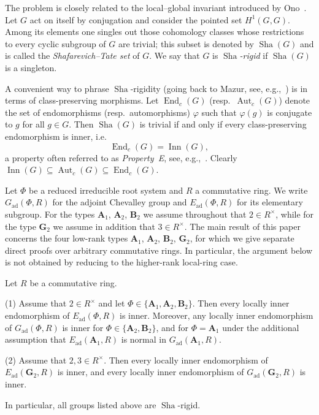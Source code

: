 \documentclass[]{jgcc}
\DeclareMathOperator{\Aut}{Aut}
\DeclareMathOperator{\End}{End}
\DeclareMathOperator{\Inn}{Inn}
\numberwithin{equation}{section}
\newcommand{\Sha}{\operatorname{Sha}}
\begin{document}
The problem is closely related to the local--global invariant introduced by Ono~\cite{BK112,BK115}.
Let $G$ act on itself by conjugation and consider the pointed set $H^{1}(G,G)$.
Among its elements one singles out those cohomology classes whose restrictions to every cyclic subgroup
of $G$ are trivial; this subset is denoted by $\Sha(G)$ and is called the \emph{Shafarevich--Tate set} of $G$.
We say that $G$ is \emph{$\Sha$-rigid} if $\Sha(G)$ is a singleton.

A convenient way to phrase $\Sha$-rigidity (going back to Mazur, see, e.g.,~\cite{BK115,Sah,BK})
is in terms of class-preserving morphisms.
Let $\End_{c}(G)$ (resp.\ $\Aut_{c}(G)$) denote the set of endomorphisms (resp.\ automorphisms)
$\varphi$ such that $\varphi(g)$ is conjugate to $g$ for all $g\in G$.
Then $\Sha(G)$ is trivial if and only if every class-preserving endomorphism is inner, i.e.
\[
\End_{c}(G)=\Inn(G),
\]
a property often referred to as \emph{Property~E}, see, e.g.,~\cite{BK}.
Clearly $\Inn(G)\subseteq \Aut_{c}(G)\subseteq \End_{c}(G)$.

Let $\Phi$ be a reduced irreducible root system and $R$ a commutative ring.
We write $G_{\mathrm{ad}}(\Phi,R)$ for the adjoint Chevalley group and
$E_{\mathrm{ad}}(\Phi,R)$ for its elementary subgroup.
For the types $\mathbf A_1$, $\mathbf A_2$, $\mathbf B_2$ we assume throughout that $2\in R^\times$,
while for the type $\mathbf G_2$ we assume in addition that $3\in R^\times$.
The main result of this paper concerns the four low-rank types
$\mathbf A_1$, $\mathbf A_2$, $\mathbf B_2$, $\mathbf G_2$,
for which we give separate direct proofs over arbitrary commutative rings.
In particular, the argument below is not obtained by reducing to the higher-rank local-ring case.

\begin{thm}\label{thm:main}
Let $R$ be a commutative ring.

\smallskip
\noindent\textup{(1)}
Assume that $2\in R^\times$ and let $\Phi\in\{\mathbf A_1,\mathbf A_2,\mathbf B_2\}$.
Then every locally inner endomorphism of $E_{\mathrm{ad}}(\Phi,R)$ is inner.
Moreover, any locally inner endomorphism of $G_{\mathrm{ad}}(\Phi,R)$ is inner for
$\Phi\in\{\mathbf A_2,\mathbf B_2\}$, and for $\Phi=\mathbf A_1$ under the additional assumption
that $E_{\mathrm{ad}}(\mathbf A_1,R)$ is normal in $G_{\mathrm{ad}}(\mathbf A_1,R)$.

\smallskip
\noindent\textup{(2)}
Assume that $2,3\in R^\times$.
Then every locally inner endomorphism of $E_{\mathrm{ad}}(\mathbf G_2,R)$ is inner, and every locally inner
endomorphism of $G_{\mathrm{ad}}(\mathbf G_2,R)$ is inner.

\smallskip
In particular, all groups listed above are $\Sha$-rigid.
\end{thm}
\end{document}
